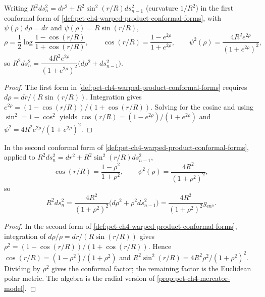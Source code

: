\begin{proposition}
  \label{prop:pet-ch4-mercator-model}
  Writing $R^2ds_n^2=dr^2+R^2\sin^2(r/R)ds_{n-1}^2$ (curvature $1/R^2$) in the
  first conformal form of \cref{def:pet-ch4-warped-product-conformal-forms},
  with $\psi(\rho)d\rho=dr$ and $\psi(\rho)=R\sin(r/R)$,
  \[
    \rho=\frac12\log\frac{1-\cos(r/R)}{1+\cos(r/R)},\qquad
    \cos(r/R)=\frac{1-e^{2\rho}}{1+e^{2\rho}},\qquad
    \psi^2(\rho)=\frac{4R^2e^{2\rho}}{(1+e^{2\rho})^2},
  \]
  so $R^2ds_n^2=\dfrac{4R^2e^{2\rho}}{(1+e^{2\rho})^2}\big(d\rho^2+ds_{n-1}^2\big)$.
\end{proposition}
\begin{proof}
  \sketch
  The first form in \cref{def:pet-ch4-warped-product-conformal-forms} requires
  $d\rho=dr/(R\sin(r/R))$. Integration gives
  $e^{2\rho}=(1-\cos(r/R))/(1+\cos(r/R))$. Solving for the cosine and using
  $\sin^2=1-\cos^2$ yields
  $\cos(r/R)=(1-e^{2\rho})/(1+e^{2\rho})$ and
  $\psi^2=4R^2e^{2\rho}/(1+e^{2\rho})^2$.
\end{proof}

\begin{proposition}
  \label{prop:pet-ch4-sphere-stereographic-conformal}
  In the second conformal form of
  \cref{def:pet-ch4-warped-product-conformal-forms}, applied to
  $R^2ds_n^2=dr^2+R^2\sin^2(r/R)ds_{n-1}^2$,
  \[
    \cos(r/R)=\frac{1-\rho^2}{1+\rho^2},\qquad
    \psi^2(\rho)=\frac{4R^2}{(1+\rho^2)^2},
  \]
  so
  \[
    R^2ds_n^2=\frac{4R^2}{(1+\rho^2)^2}\big(d\rho^2+\rho^2ds_{n-1}^2\big)
    =\frac{4R^2}{(1+\rho^2)^2}g_{\mathrm{eu}^n}.
  \]
\end{proposition}
\begin{proof}
  \sketch
  In the second form of
  \cref{def:pet-ch4-warped-product-conformal-forms}, integration of
  $d\rho/\rho=dr/(R\sin(r/R))$ gives
  $\rho^2=(1-\cos(r/R))/(1+\cos(r/R))$. Hence
  $\cos(r/R)=(1-\rho^2)/(1+\rho^2)$ and
  $R^2\sin^2(r/R)=4R^2\rho^2/(1+\rho^2)^2$. Dividing by $\rho^2$ gives the
  conformal factor; the remaining factor is the Euclidean polar metric. The
  algebra is the radial version of \cref{prop:pet-ch4-mercator-model}.
\end{proof}

